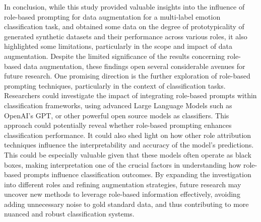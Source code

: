 \documentclass[manuscript]{clv3}
\begin{document}
In conclusion, while this study provided valuable insights into the influence of role-based prompting for data augmentation for a multi-label emotion classification task, and obtained some data on the degree of prototypicality of generated synthetic datasets and their performance across various roles, it also highlighted some limitations, particularly in the scope and impact of data augmentation. Despite the limited significance of the results concerning role-based data augmentation, these findings open several considerable avenues for future research. One promising direction is the further exploration of role-based prompting techniques, particularly in the context of classification tasks. Researchers could investigate the impact of integrating role-based prompts within classification frameworks, using advanced Large Language Models such as OpenAI's GPT, or other powerful open source models as classifiers. This approach could potentially reveal whether role-based prompting enhances classification performance. It could also shed light on how other role attribution techniques influence the interpretability and accuracy of the model’s predictions. This could be especially valuable given that these models often operate as black boxes, making interpretation one of the crucial factors in understanding how role-based prompts influence classification outcomes. By expanding the investigation into different roles and refining augmentation strategies, future research may uncover new methods to leverage role-based information effectively, avoiding adding unnecessary noise to gold standard data, and thus contributing to more nuanced and robust classification systems. 
\end{document}
